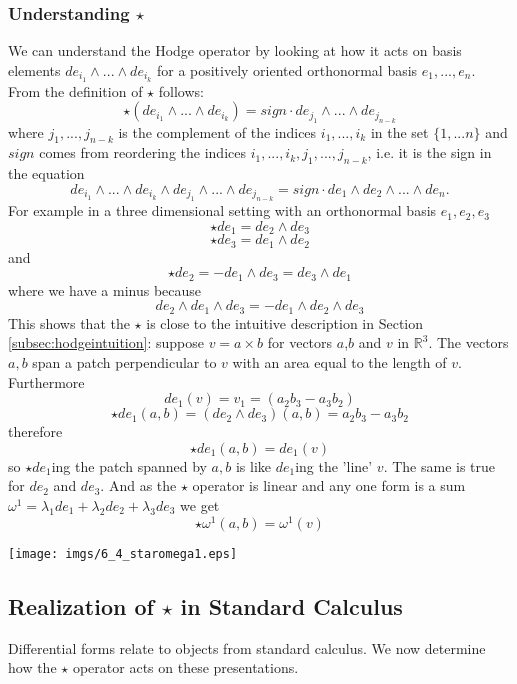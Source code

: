 \subsubsection{Understanding $\star$}
We can understand the Hodge operator by looking at how it acts on basis elements $de_{i_1}\wedge...\wedge de_{i_k}$ for a positively oriented orthonormal basis $e_1,...,e_n$. From the definition of $\star$ follows:
\[\star (de_{i_1}\wedge...\wedge de_{i_k}) = sign \cdot de_{j_1}\wedge...\wedge de_{j_{n-k}} \]
where $j_1,...,j_{n-k}$ is the complement of the indices $i_1,...,i_k$ in the set $\{1,...n\}$ and $sign$ comes from reordering the indices $i_1,...,i_k,j_1,...,j_{n-k}$, i.e. it is the sign in the equation
\[de_{i_1}\wedge...\wedge de_{i_k} \wedge de_{j_1}\wedge...\wedge de_{j_{n-k}} = sign \cdot de_1\wedge de_2 \wedge ... \wedge de_n .\]
For example in a three dimensional setting with an orthonormal basis $e_1, e_2, e_3$
\[\star de_1 =  de_2 \wedge de_3\]
\[\star de_3 =  de_1 \wedge de_2\]
and 
\[\star de_2 =  - de_1 \wedge de_3 =  de_3 \wedge de_1\]
where we have a minus because
\[de_2 \wedge de_1 \wedge de_3 = - de_1 \wedge de_2 \wedge de_3\]
This shows that the $\star$ is close to the intuitive description in Section \ref{subsec:hodgeintuition}:  suppose $v = a \times b$ for vectors $a$,$b$ and $v$ in $\mathbb R^3$. The vectors $a,b$ span a patch perpendicular to $v$ with an area equal to the length of $v$. Furthermore 
\[de_1(v) = v_1 = (a_2b_3 -a_3b_2)\] 
\[\star de_1 (a,b)= (de_2 \wedge de_3)(a,b) = a_2b_3 -a_3b_2 \]
therefore
\[\star de_1 (a,b) = de_1(v)\]
so $\star de_1$ing the patch spanned by $a,b$ is like $de_1$ing the 'line' $v$. The same is true for $de_2$ and $de_3$. And as the $\star$ operator is linear and any one form is a sum $\omega^1 = \lambda_1de_1 + \lambda_2de_2 + \lambda_3de_3$ we get
\[\star\omega^1(a,b) = \omega^1(v)\]

\vspace{0.1cm}
\begin{center}
\texttt{[image: imgs/6\_4\_staromega1.eps]}
\end{center}
\vspace{0.2cm}

\subsection{Realization of $\star$ in Standard Calculus}
Differential forms relate to objects from standard calculus. We now determine how the $\star$ operator acts on these presentations.

